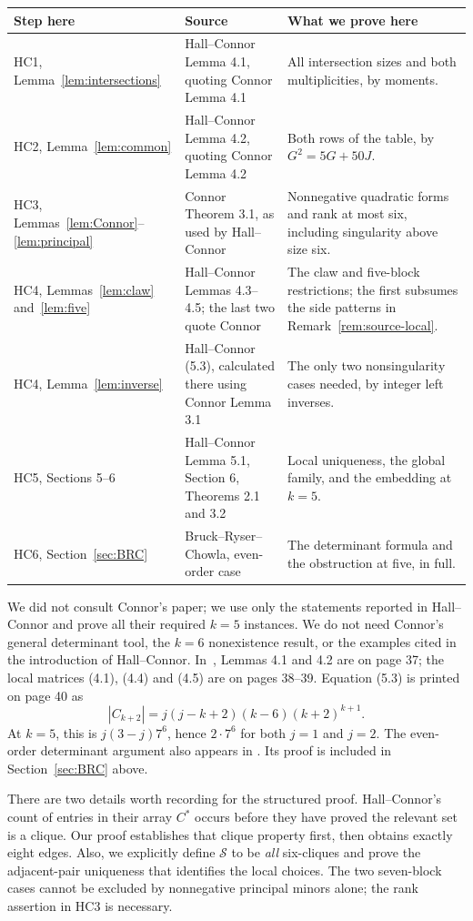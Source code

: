 \documentclass[11pt]{article}
\newcommand\cS{{\mathcal S}}
\theoremstyle{definition}
\begin{document}
\begin{center}
\begin{tabular}{L{.20\textwidth}L{.32\textwidth}L{.38\textwidth}}
\toprule
Step here & Source & What we prove here\\
\midrule
HC1, Lemma~\ref{lem:intersections} &
Hall--Connor Lemma 4.1, quoting Connor Lemma 4.1 &
All intersection sizes and both multiplicities, by moments.\\[3pt]
HC2, Lemma~\ref{lem:common} &
Hall--Connor Lemma 4.2, quoting Connor Lemma 4.2 &
Both rows of the table, by $G^2=5G+50J$.\\[3pt]
HC3, Lemmas~\ref{lem:Connor}--\ref{lem:principal} &
Connor Theorem 3.1, as used by Hall--Connor &
Nonnegative quadratic forms and rank at most six, including singularity
above size six.\\[3pt]
HC4, Lemmas~\ref{lem:claw} and~\ref{lem:five} &
Hall--Connor Lemmas 4.3--4.5; the last two quote Connor &
The claw and five-block restrictions; the first subsumes the side
patterns in Remark~\ref{rem:source-local}.\\[3pt]
HC4, Lemma~\ref{lem:inverse} &
Hall--Connor (5.3), calculated there using Connor Lemma 3.1 &
The only two nonsingularity cases needed, by integer left inverses.\\[3pt]
HC5, Sections 5--6 &
Hall--Connor Lemma 5.1, Section 6, Theorems 2.1 and 3.2 &
Local uniqueness, the global family, and the embedding at $k=5$.\\[3pt]
HC6, Section~\ref{sec:BRC} &
Bruck--Ryser--Chowla, even-order case &
The determinant formula and the obstruction at five, in full.\\
\bottomrule
\end{tabular}
\end{center}

We did not consult Connor's paper; we use only the statements
reported in Hall--Connor and prove all their required $k=5$ instances.
We do not need Connor's general determinant tool, the $k=6$
nonexistence result, or the examples cited in the introduction of
Hall--Connor. In~\cite{HC}, Lemmas 4.1
and 4.2 are on page 37; the local matrices (4.1), (4.4) and (4.5)
are on pages 38--39. Equation (5.3) is printed on page 40 as
\[
 |C_{k+2}|=j(j-k+2)(k-6)(k+2)^{k+1}.
\]
At $k=5$, this is $j(3-j)7^6$, hence $2\cdot7^6$ for both $j=1$
and $j=2$.
The even-order determinant argument also appears in
\cite[Theorem 8.3.1]{BvM}. Its proof
is included in Section~\ref{sec:BRC} above.

There are two details worth recording for the structured proof.
Hall--Connor's count of entries in their array $C^*$ occurs before
they have proved the relevant set is a clique. Our proof establishes
that clique property first, then obtains exactly eight edges.
Also, we explicitly define $\cS$ to be \emph{all} six-cliques and
prove the adjacent-pair uniqueness that identifies the local choices.
The two seven-block cases cannot be excluded by nonnegative
principal minors alone; the rank assertion in HC3 is necessary.
\end{document}
